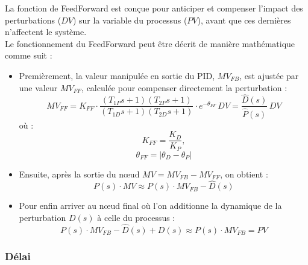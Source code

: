 La fonction de FeedForward est conçue pour anticiper et compenser l'impact des perturbations ($DV$) sur la variable du processus ($PV$), 
avant que ces dernières n'affectent le système.
\\Le fonctionnement du FeedForward peut être décrit de manière mathématique comme suit : 
\begin{itemize}
	\item 
	 Premièrement, la valeur manipulée en sortie du PID, $MV_{FB}$, est ajustée par une valeur $MV_{FF}$, calculée pour compenser directement la perturbation :
	\begin{equation} \label{eq:1}
		MV_{FF} = K_{FF}\cdot\frac{(T_{1P}s + 1)(T_{2P}s + 1)}{(T_{1D}s + 1)(T_{2D}s + 1)}\cdot e^{-\theta_{FF}}\,DV = \frac{\hat{D}(s)}{\hat{P}(s)}\,DV
	\end{equation}
	où : 
	\begin{equation}\label{eq:2}
		K_{FF} = \frac{K_D}{K_P},
	\end{equation}
	\begin{equation}\label{eq:3}
		\theta_{FF} = |\theta_D - \theta_P|
	\end{equation}
	\item 
	Ensuite, après la sortie du n\oe{}ud $MV = MV_{FB} - MV_{FF}$, on obtient : 
	\begin{equation}\label{eq:4}
		P(s)\cdot MV \approx P(s)\cdot MV_{FB} - \hat{D}(s)
	\end{equation}
	\item
	 Pour enfin arriver au n\oe{}ud final où l'on additionne la dynamique de la perturbation $D(s)$ à celle du processus : 
	\begin{equation}\label{eq:5}
		P(s)\cdot MV_{FB} - \hat{D}(s) + D(s) \approx P(s)\cdot MV_{FB} = PV
	\end{equation}
\end{itemize}
\subsubsection{Délai}

